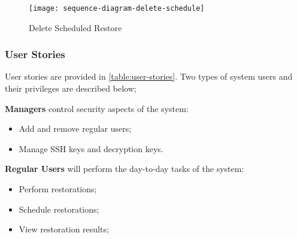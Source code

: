 		\begin{figure}[H]
			\setlength{\belowcaptionskip}{15pt plus 3pt minus 2pt}
			\caption{Delete Scheduled Restore}
			\centering
			\texttt{[image: sequence-diagram-delete-schedule]}
			\label{fig:seq-delete-restore}
		\end{figure}
	
	\subsubsection{User Stories} \label{user-stories}
   
		User stories are provided in \autoref{table:user-stories}. Two types of system users and their privileges are described below;
		
		\textbf{Managers} control security aspects of the system:
		\begin{itemize}
			\item Add and remove regular users;
			\item Manage SSH keys and decryption keys.
		\end{itemize}
		\textbf{Regular Users} will perform the day-to-day tasks of the system:
		\begin{itemize}
			\item Perform restorations;
			\item Schedule restorations;
			\item View restoration results;
		\end{itemize}
		
